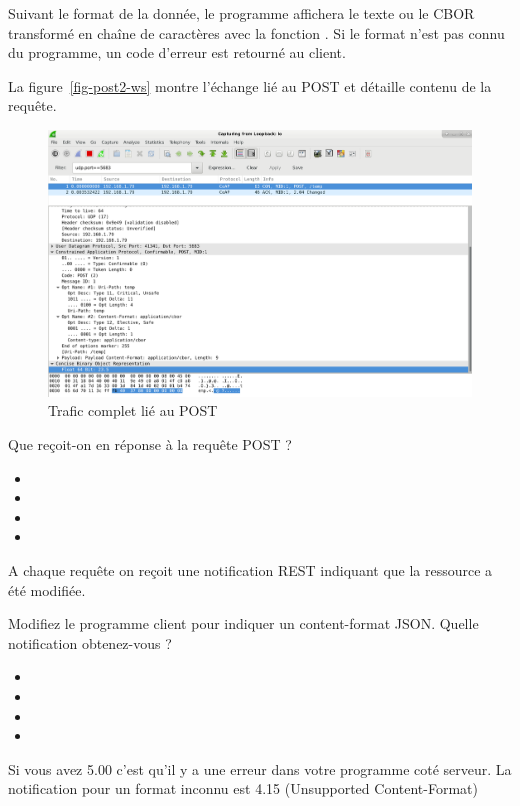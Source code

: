 Suivant le format de la donnée, le programme affichera le texte ou le CBOR transformé en chaîne de caractères avec la fonction . Si le format n’est pas connu du programme, un code d’erreur est retourné au client.

         \vspace{1em}

La figure~\vref{fig-post2-ws} montre l'échange lié au POST et détaille contenu de la requête.

\begin{figure}[tbp]
\centerline{\includegraphics[width=1\columnwidth]{Pictures/aiocoap-ws.png}}
\caption{Trafic complet lié au POST}
\label{fig-post2-ws}
\end{figure}

{Que reçoit-on en réponse à la requête POST ?

 \begin{itemize}[label=$\circ$]
   \item {}
   \item {}
   \item {}
   \item {}
\end{itemize}
 }
{
A chaque requête on reçoit une notification REST indiquant que la ressource a été modifiée. 
}

{Modifiez le programme client pour indiquer un content-format JSON. Quelle notification obtenez-vous ?


 \begin{itemize}[label=$\circ$]
   \item {}
   \item {}
   \item {}
   \item {}
\end{itemize}
 }
{
Si vous avez 5.00 c'est qu'il y a une erreur dans votre programme coté serveur. La notification pour un format inconnu est 4.15 (Unsupported Content-Format)
}

